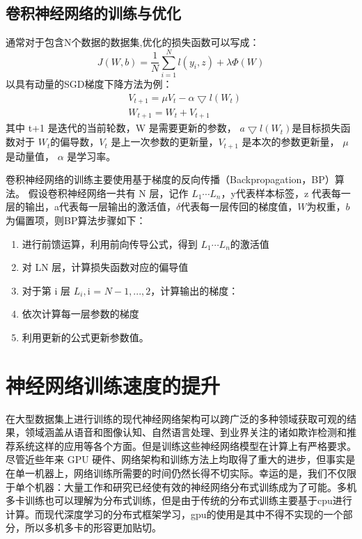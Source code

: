 \subsection{卷积神经网络的训练与优化} 通常对于包含N个数据的数据集,优化的损失函数可以写成：
\begin{equation}{
J(W,b)=\frac{1}{N}\sum_{i=1}^{N}l(y_i,z)+\lambda \Phi (W)
}
\end{equation}
以具有动量的SGD梯度下降方法为例：
\begin{equation}
\begin{split}
&V_{t+1}=\mu V_t-\alpha \bigtriangledown l(W_t) \\
&W_{t+1}=W_t+V_{t+1}
\end{split}
\end{equation}
其中 t+1 是迭代的当前轮数，W 是需要更新的参数， $a \bigtriangledown l(W_t)$是目标损失函数对于 $W_t$的偏导数，$V_t$ 是上一次参数的更新量，$V_{t+1}$ 是本次的参数更新量， $\mu$ 是动量值， $\alpha$ 是学习率。

卷积神经网络的训练主要使用基于梯度的反向传播（Backpropagation，BP）\cite{BP}算法。 假设卷积神经网络一共有 N 层，记作 $L_1\cdots L_n$，y代表样本标签，z 代表每一层的输出，a代表每一层输出的激活值，$\delta$代表每一层传回的梯度值，$W$为权重，$b$为偏置项，则BP算法步骤如下：
\begin{enumerate}
\item 进行前馈运算，利用前向传导公式，得到 $L_1\cdots L_n$的激活值
\item 对 LN 层，计算损失函数对应的偏导值
\item 对于第 i 层 $L_i,$i = $N−1,...,2$，计算输出的梯度：

\item 依次计算每一层参数的梯度
\item 利用更新的公式更新参数值。
\end{enumerate}

\section{神经网络训练速度的提升}
在大型数据集上进行训练的现代神经网络架构可以跨广泛的多种领域获取可观的结果，领域涵盖从语音和图像认知、自然语言处理、到业界关注的诸如欺诈检测和推荐系统这样的应用等各个方面。但是训练这些神经网络模型在计算上有严格要求。尽管近些年来 GPU\cite{CUDA} 硬件、网络架构和训练方法上均取得了重大的进步，但事实是在单一机器上，网络训练所需要的时间仍然长得不切实际。幸运的是，我们不仅限于单个机器：大量工作和研究已经使有效的神经网络分布式训练成为了可能。多机多卡训练也可以理解为分布式训练，但是由于传统的分布式训练主要基于cpu进行计算。而现代深度学习的分布式框架学习，gpu的使用是其中不得不实现的一个部分，所以多机多卡的形容更加贴切。

